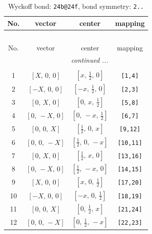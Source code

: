 \documentclass[fleqn,8pt]{jsarticle}
\begin{document}
\renewcommand{\arraystretch}{1.2}
\begin{longtable}{cccc}
\caption{Wyckoff bond: {\tt 24b@24f}, bond symmetry: {\tt 2..}}
 \\
 \hline \hline
No. & vector & center & mapping \\ \hline \endfirsthead

\multicolumn{3}{l}{\tablename\ \thetable{}} \\
 \hline \hline
No. & vector & center & mapping \\ \hline \endhead

 \hline \hline
\multicolumn{3}{r}{\footnotesize\it continued ...} \\ \endfoot

 \hline \hline
\multicolumn{3}{r}{} \\ \endlastfoot

1 & $\left[ X,\, 0,\, 0 \right]$ & $\left[ x,\, \frac{1}{2},\, 0 \right]$ & {\tt [1,4]} \\ \hline
2 & $\left[ - X,\, 0,\, 0 \right]$ & $\left[ - x,\, \frac{1}{2},\, 0 \right]$ & {\tt [2,3]} \\ \hline
3 & $\left[ 0,\, X,\, 0 \right]$ & $\left[ 0,\, x,\, \frac{1}{2} \right]$ & {\tt [5,8]} \\ \hline
4 & $\left[ 0,\, - X,\, 0 \right]$ & $\left[ 0,\, - x,\, \frac{1}{2} \right]$ & {\tt [6,7]} \\ \hline
5 & $\left[ 0,\, 0,\, X \right]$ & $\left[ \frac{1}{2},\, 0,\, x \right]$ & {\tt [9,12]} \\ \hline
6 & $\left[ 0,\, 0,\, - X \right]$ & $\left[ \frac{1}{2},\, 0,\, - x \right]$ & {\tt [10,11]} \\ \hline
7 & $\left[ 0,\, X,\, 0 \right]$ & $\left[ \frac{1}{2},\, x,\, 0 \right]$ & {\tt [13,16]} \\ \hline
8 & $\left[ 0,\, - X,\, 0 \right]$ & $\left[ \frac{1}{2},\, - x,\, 0 \right]$ & {\tt [14,15]} \\ \hline
9 & $\left[ X,\, 0,\, 0 \right]$ & $\left[ x,\, 0,\, \frac{1}{2} \right]$ & {\tt [17,20]} \\ \hline
10 & $\left[ - X,\, 0,\, 0 \right]$ & $\left[ - x,\, 0,\, \frac{1}{2} \right]$ & {\tt [18,19]} \\ \hline
11 & $\left[ 0,\, 0,\, X \right]$ & $\left[ 0,\, \frac{1}{2},\, x \right]$ & {\tt [21,24]} \\ \hline
12 & $\left[ 0,\, 0,\, - X \right]$ & $\left[ 0,\, \frac{1}{2},\, - x \right]$ & {\tt [22,23]} \\
\end{longtable}
\end{document}
